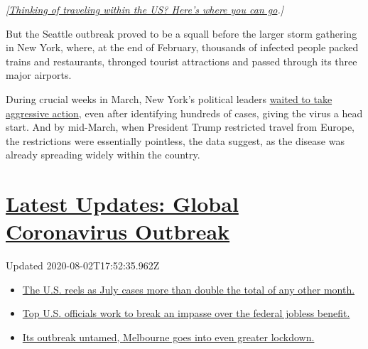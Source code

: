 \emph{{[}}\href{https://www.nytimes.com/2020/07/10/travel/state-travel-restrictions.html}{\emph{Thinking
of traveling within the US? Here's where you can go}}\emph{.{]}}

But the Seattle outbreak proved to be a squall before the larger storm
gathering in New York, where, at the end of February, thousands of
infected people packed trains and restaurants, thronged tourist
attractions and passed through its three major airports.

During crucial weeks in March, New York's political leaders
\href{https://www.nytimes.com/2020/04/08/nyregion/new-york-coronavirus-response-delays.html}{waited
to take aggressive action}, even after identifying hundreds of cases,
giving the virus a head start. And by mid-March, when President Trump
restricted travel from Europe, the restrictions were essentially
pointless, the data suggest, as the disease was already spreading widely
within the country.

\hypertarget{latest-updates-global-coronavirus-outbreak}{%
\section{\texorpdfstring{\href{https://www.nytimes.com/2020/08/01/world/coronavirus-covid-19.html?action=click\&pgtype=Article\&state=default\&region=MAIN_CONTENT_1\&context=storylines_live_updates}{Latest
Updates: Global Coronavirus
Outbreak}}{Latest Updates: Global Coronavirus Outbreak}}\label{latest-updates-global-coronavirus-outbreak}}

Updated 2020-08-02T17:52:35.962Z

\begin{itemize}
\tightlist
\item
  \href{https://www.nytimes.com/2020/08/01/world/coronavirus-covid-19.html?action=click\&pgtype=Article\&state=default\&region=MAIN_CONTENT_1\&context=storylines_live_updates\#link-34047410}{The
  U.S. reels as July cases more than double the total of any other
  month.}
\item
  \href{https://www.nytimes.com/2020/08/01/world/coronavirus-covid-19.html?action=click\&pgtype=Article\&state=default\&region=MAIN_CONTENT_1\&context=storylines_live_updates\#link-780ec966}{Top
  U.S. officials work to break an impasse over the federal jobless
  benefit.}
\item
  \href{https://www.nytimes.com/2020/08/01/world/coronavirus-covid-19.html?action=click\&pgtype=Article\&state=default\&region=MAIN_CONTENT_1\&context=storylines_live_updates\#link-2bc8948}{Its
  outbreak untamed, Melbourne goes into even greater lockdown.}
\end{itemize}

